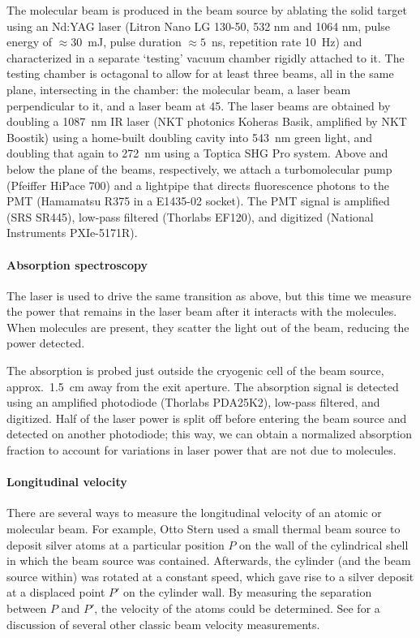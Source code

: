 The molecular beam is produced in the beam source by ablating the solid target
using an Nd:YAG laser (Litron Nano LG 130-50, 532 nm and 1064 nm, pulse energy
of $\approx30$~mJ, pulse duration $\approx5$~ns, repetition rate 10~Hz) and
characterized in a separate `testing' vacuum chamber rigidly attached to it. The
testing chamber is octagonal to allow for at least three beams, all in the same
plane, intersecting in the chamber: the molecular beam, a laser beam
perpendicular to it, and a laser beam at 45\deg. The laser beams are obtained by
doubling a 1087~nm IR laser (NKT photonics Koheras Basik, amplified by NKT
Boostik) using a home-built doubling cavity into 543~nm green light, and
doubling that again to 272~nm using a Toptica SHG Pro system. Above and below
the plane of the beams, respectively, we attach a turbomolecular pump (Pfeiffer
HiPace 700) and a lightpipe that directs fluorescence photons to the \gls{PMT}
(Hamamatsu R375 in a E1435-02 socket). The \gls{PMT} signal is amplified (SRS
SR445), low-pass filtered (Thorlabs EF120), and digitized (National Instruments
PXIe-5171R).

\paragraph{Absorption spectroscopy}

The laser is used to drive the same transition as above, but this time we
measure the power that remains in the laser beam after it interacts with the
molecules. When molecules are present, they scatter the light out of the beam,
reducing the power detected.

The absorption is probed just outside the cryogenic cell of the beam source,
approx.\ 1.5~cm away from the exit aperture. The absorption signal is detected
using an amplified photodiode (Thorlabs PDA25K2), low-pass filtered, and
digitized. Half of the laser power is split off before entering the beam source
and detected on another photodiode; this way, we can obtain a normalized
absorption fraction to account for variations in laser power that are not due to
molecules.

\paragraph{Longitudinal velocity}

There are several ways to measure the longitudinal velocity of an atomic or
molecular beam. For example, Otto Stern \cite{stern1920direkte} used a small
thermal beam source to deposit silver atoms at a particular position $P$ on the
wall of the cylindrical shell in which the beam source was contained.
Afterwards, the cylinder (and the beam source within) was rotated at a constant
speed, which gave rise to a silver deposit at a displaced point $P'$ on the
cylinder wall. By measuring the separation between $P$ and $P'$, the velocity of
the atoms could be determined. See \cite[sect~II.3.4]{ramsey1956molecular}
for a discussion of several other classic beam velocity measurements.

